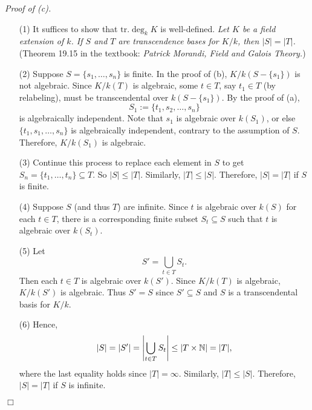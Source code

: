 \documentclass{article}
\begin{document}
\emph{Proof of (c).}
\begin{enumerate}
\item[(1)]
  It suffices to show that $\mathrm{tr.} \deg_k K$ is well-defined.
  \emph{Let $K$ be a field extension of $k$.
  If $S$ and $T$ are transcendence bases for $K/k$,
  then $|S| = |T|$.}
  (Theorem 19.15 in the textbook: \emph{Patrick Morandi, Field and Galois Theory.})

\item[(2)]
  Suppose $S = \{s_1,\ldots,s_n\}$ is finite.
  In the proof of (b), $K/k(S-\{s_1\})$ is not algebraic.
  Since $K/k(T)$ is algebraic, some $t \in T$, say $t_1 \in T$ (by relabeling),
  must be transcendental over $k(S-\{s_1\})$.
  By the proof of (a),
  \[
    S_1 := \{ t_1,s_2,\ldots,s_n \}
  \]
  is algebraically independent.
  Note that $s_1$ is algebraic over $k(S_1)$,
  or else $\{ t_1,s_1,\ldots,s_n \}$ is algebraically independent,
  contrary to the assumption of $S$.
  Therefore, $K/k(S_1)$ is algebraic.

\item[(3)]
  Continue this process to replace each element in $S$ to get
  $S_n = \{ t_1, \ldots, t_n \} \subseteq T$.
  So $|S| \leq |T|$. Similarly, $|T| \leq |S|$.
  Therefore, $|S| = |T|$ if $S$ is finite.

\item[(4)]
  Suppose $S$ (and thus $T$) are infinite.
  Since $t$ is algebraic over $k(S)$ for each $t \in T$,
  there is a corresponding finite subset $S_t \subseteq S$ such that
  $t$ is algebraic over $k(S_t)$.

\item[(5)]
  Let
  \[
    S' = \bigcup_{t \in T} S_t.
  \]
  Then each $t \in T$ is algebraic over $k(S')$.
  Since $K/k(T)$ is algebraic, $K/k(S')$ is algebraic.
  Thus $S' = S$ since $S' \subseteq S$ and $S$ is a transcendental basis for $K/k$.

\item[(6)]
  Hence,
  \[
    |S|
    = |S'|
    = \abs{\bigcup_{t \in T} S_t}
    \leq |T \times \mathbb{N}|
    = |T|,
  \]
  where the last equality holds since $|T| = \infty$.
  Similarly, $|T| \leq |S|$.
  Therefore, $|S| = |T|$ if $S$ is infinite.
\end{enumerate}
$\Box$ \\\\



\end{document}

